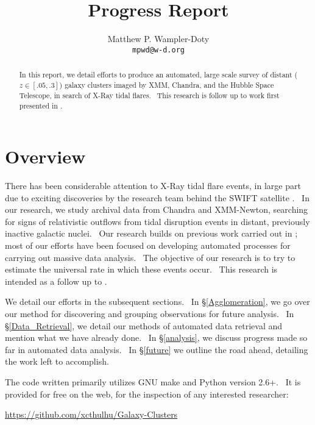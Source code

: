 \documentclass{amsart}
\begin{document}
\title{Progress Report}
\author{Matthew P. Wampler-Doty\\
\texttt{mpwd@w-d.org}}
\maketitle

\begin{abstract}
  In this report, we detail efforts to produce an automated, large scale
  survey of distant ($z \in [.05, .3]$) galaxy clusters imaged by XMM,
  Chandra, and the Hubble Space Telescope, in search of X-Ray tidal flares. \
  This research is follow up to work first presented in
  {\cite{maksym_constraining_2010,maksym_tidal_2010}}.
\end{abstract}

\section{Overview}

There has been considerable attention to X-Ray tidal flare events, in large
part due to exciting discoveries by the research team behind the SWIFT
satellite {\cite{bloom_possible_2011,metzger_afterglow_2011}}. \ In our
research, we study archival data from Chandra and XMM-Newton, searching for
signs of relativistic outflows from tidal disruption events in distant,
previously inactive galactic nuclei. \ Our research builds on previous work
carried out in {\cite{maksym_tidal_2010}}; most of our efforts have been
focused on developing automated processes for carrying out massive data
analysis. \ The objective of our research is to try to estimate the universal
rate in which these events occur. \ This research is intended as a follow up
to {\cite{maksym_constraining_2010,maksym_tidal_2010}}.

We detail our efforts in the subsequent sections. \ In
{\S}\ref{Agglomeration}, we go over our method for discovering and grouping
observations for future analysis. \ In {\S}\ref{Data_Retrieval}, we detail our
methods of automated data retrieval and mention what we have already done. \
In {\S}\ref{analysis}, we discuss progress made so far in automated data
analysis. \ In {\S}\ref{future} we outline the road ahead, detailing the work
left to accomplish.

The code written primarily utilizes GNU make and Python version 2.6+. \ It is
provided for free on the web, for the inspection of any interested researcher:

\begin{center}
  \href{https://github.com/xcthulhu/Galaxy-Clusters}{https://github.com/xcthulhu/Galaxy-Clusters}
\end{center}
\end{document}

